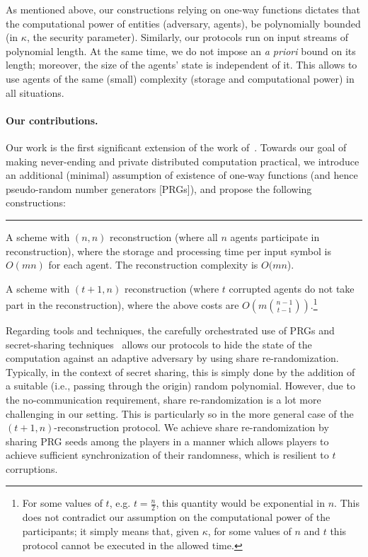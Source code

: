 \documentclass[letterpaper,11pt]{article}
\newlength{\saveparindent}
\newlength{\saveparskip}
\newenvironment{tiret}{\begin{list}{\hspace{1pt}\rule[0.5ex]{6pt}{1pt}\hfill}{\labelwidth=15pt\labelsep=3pt \leftmargin=18pt \topsep=1pt\setlength{\listparindent}{\saveparindent}\setlength{\parsep}{\saveparskip}\setlength{\itemsep}{1pt}}}{\end{list}}
\begin{document}
As mentioned above, our constructions relying on one-way functions
dictates that the computational power of entities (adversary, agents),
be polynomially bounded (in
$\kappa$, the security parameter).
Similarly, our protocols run on input streams of polynomial length.
At the same time, we do not impose an {\it a priori} bound on its length; 
moreover, the size of the agents' state is independent of it.
This allows  to use agents of the same (small) complexity (storage and 
computational power) in all situations.


\vspace{-.1in}

\paragraph{Our contributions.}
Our work is the first significant extension of the work
of~\cite{DGGK11}.  Towards our goal of making never-ending and private
distributed computation practical, we introduce an additional (minimal)
assumption of existence of one-way functions (and hence pseudo-random
number generators [PRGs]), and propose the following constructions:
\begin{tiret}
\item  A scheme with $(n,n)$ reconstruction (where all $n$ agents participate in reconstruction), where
the storage and processing time per input symbol is $O(mn)$ for each
agent. The reconstruction complexity is $O(mn$).
\item A scheme with $(t+1,n)$ reconstruction (where $t$ corrupted agents do not 
take part in the reconstruction), where the above costs are 
$O (m{n-1 \choose t-1})$.\footnote{For some values of $t$, e.g. $t=\frac{n}{2}$, this quantity would be exponential in $n$. This does not contradict our
assumption on the computational power of the participants; it simply
means that, given $\kappa$, for some values of $n$ and $t$ this
protocol cannot be executed in the allowed time.}
\end{tiret} 
Regarding tools and techniques, the carefully orchestrated use of PRGs
and secret-sharing techniques~\cite{Sha79} allows our protocols to hide the state of the computation against an adaptive adversary by using share re-randomization. 
Typically, in the context of secret sharing, this is simply done by the addition of a suitable (i.e., passing through the origin) random polynomial. However, due to the no-communication requirement, share re-randomization is a lot more challenging in our setting. This is particularly so in the more general case of the $(t+1,n)$-reconstruction protocol. We achieve share re-randomization by sharing PRG seeds among the players in a manner which allows players to achieve sufficient synchronization of their randomness, which is resilient to $t$ corruptions.
\end{document}
